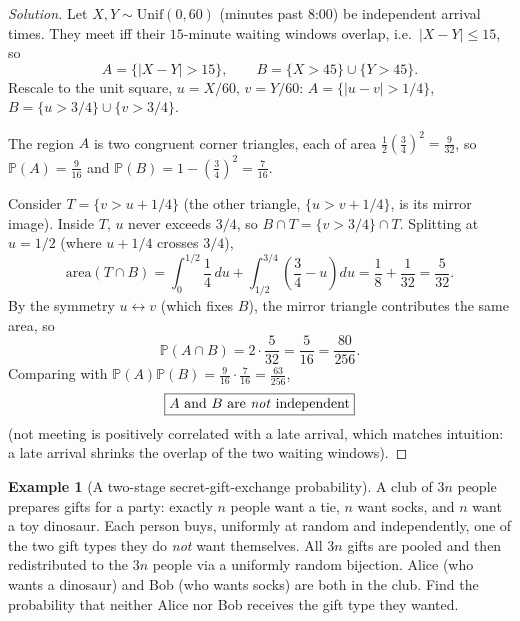 \documentclass[11pt]{article}
\theoremstyle{definition}
\newtheorem{example}{Example}[section]
\begin{document}
\begin{proof}[Solution]
Let $X,Y\sim\mathrm{Unif}(0,60)$ (minutes past 8:00) be independent arrival times. They meet iff their $15$-minute waiting windows overlap, i.e.\ $|X-Y|\le15$, so
\[
A=\{|X-Y|>15\}, \qquad B=\{X>45\}\cup\{Y>45\}.
\]
Rescale to the unit square, $u=X/60,\,v=Y/60$: $A=\{|u-v|>1/4\}$, $B=\{u>3/4\}\cup\{v>3/4\}$.

The region $A$ is two congruent corner triangles, each of area $\tfrac12(\tfrac34)^2=\tfrac{9}{32}$, so $\mathbb{P}(A)=\tfrac{9}{16}$ and $\mathbb{P}(B)=1-(\tfrac34)^2=\tfrac{7}{16}$.

Consider $T=\{v>u+1/4\}$ (the other triangle, $\{u>v+1/4\}$, is its mirror image). Inside $T$, $u$ never exceeds $3/4$, so $B\cap T=\{v>3/4\}\cap T$. Splitting at $u=1/2$ (where $u+1/4$ crosses $3/4$),
\[
\mathrm{area}(T\cap B)=\int_0^{1/2}\frac14\,du+\int_{1/2}^{3/4}\left(\frac34-u\right)du=\frac18+\frac{1}{32}=\frac{5}{32}.
\]
By the symmetry $u\leftrightarrow v$ (which fixes $B$), the mirror triangle contributes the same area, so
\[
\mathbb{P}(A\cap B)=2\cdot\frac{5}{32}=\frac{5}{16}=\frac{80}{256}.
\]
Comparing with $\mathbb{P}(A)\mathbb{P}(B)=\tfrac{9}{16}\cdot\tfrac{7}{16}=\tfrac{63}{256}$,
\[
\boxed{A\text{ and }B\text{ are \emph{not} independent}}
\]
(not meeting is positively correlated with a late arrival, which matches intuition: a late arrival shrinks the overlap of the two waiting windows).
\end{proof}

\begin{example}[A two-stage secret-gift-exchange probability]
A club of $3n$ people prepares gifts for a party: exactly $n$ people want a tie, $n$ want socks, and $n$ want a toy dinosaur. Each person buys, uniformly at random and independently, one of the two gift types they do \emph{not} want themselves. All $3n$ gifts are pooled and then redistributed to the $3n$ people via a uniformly random bijection. Alice (who wants a dinosaur) and Bob (who wants socks) are both in the club. Find the probability that neither Alice nor Bob receives the gift type they wanted.
\end{example}
\end{document}
